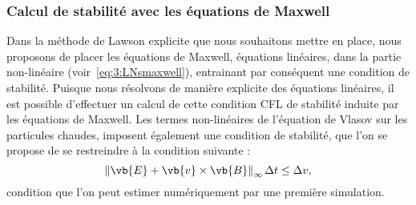 \subsubsection{Calcul de stabilité avec les équations de Maxwell}
\label{ssec:3:cflMaxwell}

Dans la méthode de Lawson explicite que nous souhaitons mettre en place, nous proposons de placer les équations de Maxwell, équations linéaires, dans la partie non-linéaire (voir~\eqref{eq:3:LNsmaxwell}), entrainant par conséquent une condition de stabilité. Puisque nous résolvons de manière explicite des équations linéaires, il est possible d'effectuer un calcul de cette condition CFL de stabilité induite par les équations de Maxwell. Les termes non-linéaires de l'équation de Vlasov sur les particules chaudes, imposent également une condition de stabilité, que l'on se propose de se restreindre à la condition suivante :
$$
  \left\|\vb{E}+\vb{v}\times \vb{B}\right\|_{\infty} \Delta t \leq \Delta v,
$$
condition que l'on peut estimer numériquement par une première simulation.

